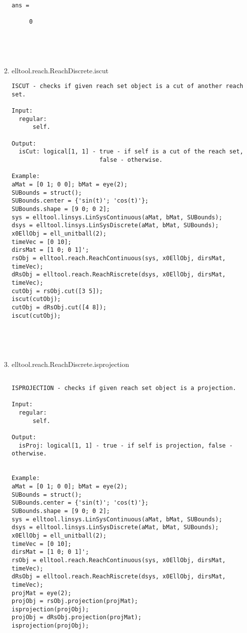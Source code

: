 \begin{enumerate}
\begin{lstlisting}
ans =

     0





\end{lstlisting}
\fontfamily{\familydefault}
\selectfont
\item {elltool.reach.ReachDiscrete.iscut}
\selectfont
\begin{lstlisting}
ISCUT - checks if given reach set object is a cut of another reach set.

Input:
  regular:
      self.

Output:
  isCut: logical[1, 1] - true - if self is a cut of the reach set,
                         false - otherwise.

Example:
aMat = [0 1; 0 0]; bMat = eye(2);
SUBounds = struct();
SUBounds.center = {'sin(t)'; 'cos(t)'};
SUBounds.shape = [9 0; 0 2];
sys = elltool.linsys.LinSysContinuous(aMat, bMat, SUBounds);
dsys = elltool.linsys.LinSysDiscrete(aMat, bMat, SUBounds);
x0EllObj = ell_unitball(2);
timeVec = [0 10];
dirsMat = [1 0; 0 1]';
rsObj = elltool.reach.ReachContinuous(sys, x0EllObj, dirsMat, timeVec);
dRsObj = elltool.reach.ReachRiscrete(dsys, x0EllObj, dirsMat, timeVec);
cutObj = rsObj.cut([3 5]);
iscut(cutObj);
cutObj = dRsObj.cut([4 8]);
iscut(cutObj);





\end{lstlisting}
\fontfamily{\familydefault}
\selectfont
\item {elltool.reach.ReachDiscrete.isprojection}
\selectfont
\begin{lstlisting}

ISPROJECTION - checks if given reach set object is a projection.

Input:
  regular:
      self.

Output:
  isProj: logical[1, 1] - true - if self is projection, false - otherwise.


Example:
aMat = [0 1; 0 0]; bMat = eye(2);
SUBounds = struct();
SUBounds.center = {'sin(t)'; 'cos(t)'};
SUBounds.shape = [9 0; 0 2];
sys = elltool.linsys.LinSysContinuous(aMat, bMat, SUBounds);
dsys = elltool.linsys.LinSysDiscrete(aMat, bMat, SUBounds);
x0EllObj = ell_unitball(2);
timeVec = [0 10];
dirsMat = [1 0; 0 1]';
rsObj = elltool.reach.ReachContinuous(sys, x0EllObj, dirsMat, timeVec);
dRsObj = elltool.reach.ReachRiscrete(dsys, x0EllObj, dirsMat, timeVec);
projMat = eye(2);
projObj = rsObj.projection(projMat);
isprojection(projObj);
projObj = dRsObj.projection(projMat);
isprojection(projObj);






\end{lstlisting}
\end{enumerate}
